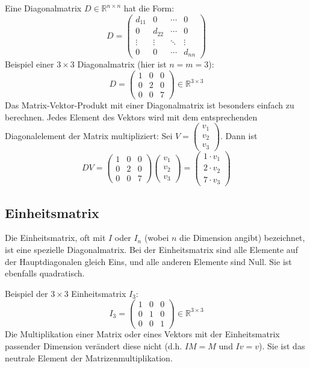 Eine Diagonalmatrix $D \in \mathbb{R}^{n \times n}$ hat die Form:
\[
   D = \begin{pmatrix}
      d_{11} & 0      & \cdots & 0      \\
      0      & d_{22} & \cdots & 0      \\
      \vdots & \vdots & \ddots & \vdots \\
      0      & 0      & \cdots & d_{nn}
   \end{pmatrix}
\]
Beispiel einer $3 \times 3$ Diagonalmatrix (hier ist $n=m=3$):
\[
   D = \begin{pmatrix}
      1 & 0 & 0 \\
      0 & 2 & 0 \\
      0 & 0 & 7
   \end{pmatrix}
   \in \mathbb{R}^{3 \times 3}
\]
Das Matrix-Vektor-Produkt mit einer Diagonalmatrix ist besonders einfach zu
berechnen. Jedes Element des Vektors wird mit dem entsprechenden
Diagonalelement der Matrix multipliziert: Sei $V = \begin{pmatrix}v_1\\v_2\\v_3\end{pmatrix}$. Dann ist
\[
   D V = \begin{pmatrix}
      1 & 0 & 0 \\
      0 & 2 & 0 \\
      0 & 0 & 7
   \end{pmatrix}
   \begin{pmatrix}v_1\\v_2\\v_3\end{pmatrix}
   = \begin{pmatrix}1 \cdot v_1\\2 \cdot v_2\\7 \cdot v_3\end{pmatrix}
\]

\subsection{Einheitsmatrix}

Die Einheitsmatrix, oft mit $I$ oder $I_n$ (wobei $n$ die Dimension angibt)
bezeichnet, ist eine spezielle Diagonalmatrix. Bei der Einheitsmatrix sind alle
Elemente auf der Hauptdiagonalen gleich Eins, und alle anderen Elemente sind
Null. Sie ist ebenfalls quadratisch.

Beispiel der $3 \times 3$ Einheitsmatrix $I_3$:
\[
   I_3 = \begin{pmatrix}
      1 & 0 & 0 \\
      0 & 1 & 0 \\
      0 & 0 & 1
   \end{pmatrix}
   \in \mathbb{R}^{3 \times 3}
\]
Die Multiplikation einer Matrix oder eines Vektors mit der Einheitsmatrix
passender Dimension verändert diese nicht (d.h. $IM = M$ und $Iv = v$). Sie ist
das neutrale Element der Matrizenmultiplikation.

